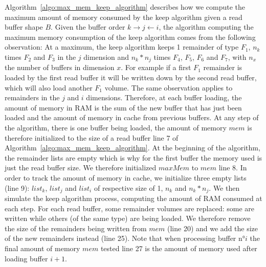 \documentclass[sigconf, nonacm]{acmart}
\begin{document}
Algorithm~\ref{algo:max_mem_keep_algorithm} describes how we compute the
maximum amount of memory consumed by the keep algorithm given a read buffer shape $B$.
Given the buffer order $k\rightarrow j\leftarrow i$, the algorithm computing
the maximum memory consumption of the keep algorithm comes from the following
observation:
At a maximum, the keep algorithm keeps 1 remainder of type $F_1$,
$n_k$ times $F_2$ and $F_3$ in the $j$ dimension and $n_k*n_j$ times $F_4$, $F_5$,
$F_6$ and $F_7$, with $n_x$ the number of buffers in dimension $x$.
For example if a first $F_1$ remainder is loaded by the first read buffer it
will be written down by the second read buffer, which will also load another $F_1$
volume.
The same observation applies to remainders in the $j$ and $i$ dimensions.
Therefore, at each buffer loading, the amount of memory in RAM is the sum of the
new buffer that has just been loaded and the amount of memory in cache from
previous buffers.
At any step of the algorithm, there is one buffer being loaded, the amount of
memory $mem$ is therefore initialized to the size of a read buffer line 7 of
Algorithm~\ref{algo:max_mem_keep_algorithm}.
At the beginning of the algorithm, the remainder lists are empty which is why
for the first buffer the memory used is just the read buffer size.
We therefore initialized $maxMem$ to $mem$ line 8.
In order to track the amount of memory in cache, we initialize three empty lists
(line 9): $list_k$, $list_j$ and $list_i$ of respective size of 1, $n_k$ and $n_k*n_j$.
We then simulate the keep algorithm process, computing the amount of RAM consumed at
each step.
For each read buffer, some remainder volumes are replaced: some are written
while others (of the same type) are being loaded.
We therefore remove the size of the remainders being written from $mem$ (line 20)
and we add the size of the new remainders instead (line 25).
Note that when processing buffer n°$i$ the final amount of memory $mem$ tested
line 27 is the amount of memory used after loading buffer $i+1$.
\end{document}

